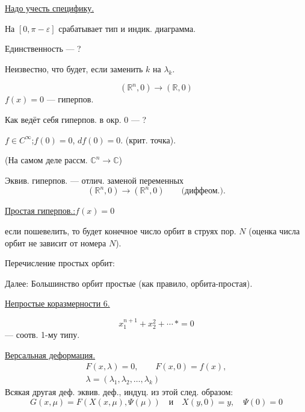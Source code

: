 \uline{Надо учесть специфику.}

На $[0,\pi-\varepsilon]$ срабатывает тип и индик. диаграмма.

Единственность — ?

Неизвестно, что будет, если заменить $k$ на $\lambda_k$.



\qquad{}

\[
(\mathbb R^n,0)\longrightarrow(\mathbb R,0)
\]
$f(x)=0$ — гиперпов.

Как ведёт себя гиперпов. в окр. $0$ — ?

$f\in C^\infty$;\quad $f(0)=0$, $df(0)=0$. (крит. точка).

(На самом деле рассм. $\mathbb C^n\longrightarrow\mathbb C$)

Эквив. гиперпов. — отлич. заменой переменных
\[
(\mathbb R^n,0)\longrightarrow(\mathbb R^n,0)\qquad
\text{(диффеом.)}.
\]

\uline{Простая гиперпов.:}\qquad\uline{\mbox{$f(x)=0$}}

если пошевелить, то будет конечное число орбит
в струях пор. $N$ (оценка числа орбит не зависит от номера $N$).

Перечисление простых орбит:



Далее: Большинство орбит простые (как правило, орбита-простая).

\uline{Непростые коразмерности 6.}

\[
x_1^{n+1}+x_2^2+\cdots\,\ast=0
\]
— соотв. 1-му типу.


\uline{Версальная деформация.}
\[
\begin{gathered}
F(x,\lambda)=0,\qquad F(x,0)=f(x),\\
\lambda=(\lambda_1,\lambda_2,\ldots,\lambda_k)
\end{gathered}
\]
Всякая другая деф. эквив. деф., индуц. из этой след. образом:
\[
G(x,\mu)=F(X(x,\mu),\Psi(\mu))
\quad\text{и}\quad X(y,0)=y,\quad\Psi(0)=0
\]


